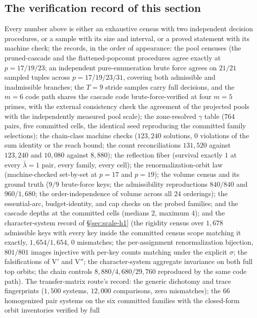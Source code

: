 \documentclass[11pt,a4paper]{article}
\numberwithin{equation}{section}
\theoremstyle{plain}
\theoremstyle{definition}
\theoremstyle{remark}
\begin{document}
\subsection{The verification record of this section}\label{sec:scale-sound}

Every number above is either an exhaustive census with two independent
decision procedures, or a sample with its size and interval, or a
proved statement with its machine check; the records, in the order of
appearance: the pool censuses (the pruned-cascade and the
flattened-popcount procedures agree exactly at $p=17/19/23$; an
independent pure-enumeration brute force agrees on $21/21$ sampled
tuples across $p=17/19/23/31$, covering both admissible and
inadmissible branches; the $T=9$ stride samples carry full decisions,
and the $m=6$ code path shares the cascade code brute-force-verified
at four $m=5$ primes, with the external consistency check the
agreement of the projected pools with the independently measured pool
scale); the zone-resolved $\gamma$ table ($764$ pairs, five committed
cells, the identical seed reproducing the committed family
selections); the chain-class machine checks ($123{,}240$ solutions,
$0$ violations of the sum identity or the reach bound; the count
reconciliations $131{,}520$ against $123{,}240$ and $10{,}080$ against
$8{,}880$); the reflection fiber (survival exactly $1$ at every
$\bar\lambda=1$ pair, every family, every cell); the
renormalization-orbit law (machine-checked set-by-set at $p=17$ and
$p=19$); the volume census and its ground truth ($9/9$ brute-force
keys; the admissibility reproductions $840/840$ and $960/1{,}680$; the
order-independence of volume across all $24$ orderings); the
essential-arc, budget-identity, and cap checks on the probed families;
and the cascade depths at the committed cells (medians $2$, maximum
$4$); and the character-system record of \S\ref{sec:scale-h1} (the
rigidity census over $1{,}678$ admissible keys with every key inside
the committed census scope matching it exactly, $1{,}654/1{,}654$, $0$
mismatches; the per-assignment renormalization bijection, $801/801$
images injective with per-key counts matching under the explicit
$\sigma$; the falsifications of V$'$ and V$''$; the character-system
aggregate invariance on both full top orbits; the chain controls
$8{,}880/4{,}680/29{,}760$ reproduced by the same code path). The
transfer-matrix route's record: the generic dichotomy and trace
fingerprints ($1{,}500$ systems, $12{,}000$ comparisons, zero
mismatches); the $66$ homogenized pair systems on the six committed
families with the closed-form orbit inventories verified by full
\end{document}
